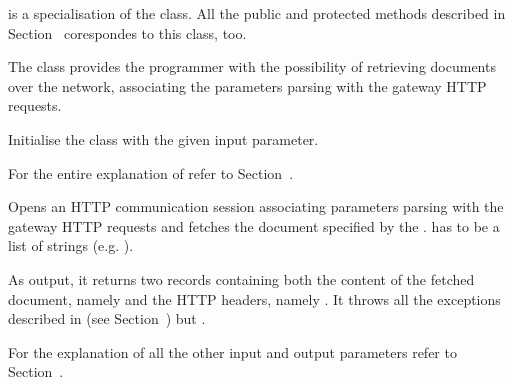 \documentclass{ozdoc}
\begin{document}
 is a specialisation of the  class. All the public and protected methods described in Section~ corespondes to this class, too.

The  class provides the programmer with the possibility of retrieving documents over the network, associating the parameters parsing with the gateway  HTTP requests. \mozartEMPTY
 \mozartEMPTY
\begin{mozartDESCRIPTION}
\mozartENTRYHASCODE
\begin{mozartSYNOPSIS}
\begin{mozartCODEDISPLAY}\mozartFACETEXT{)}\end{mozartCODEDISPLAY}
\end{mozartSYNOPSIS}
\mozartITEM Initialise the class with the given  input parameter.

  \mozartEMPTY
For the entire explanation of  refer to Section~. \mozartEMPTY
{}\mozartENTRYHASCODE
\begin{mozartSYNOPSIS}
\begin{mozartCODEDISPLAY}\mozartFACETEXT{\mozartSPACE{}}\mozartFACETEXT{\mozartSPACE{}}\mozartFACETEXT{\mozartSPACE{}}\mozartFACETEXT{)}\end{mozartCODEDISPLAY}
\end{mozartSYNOPSIS}
\mozartITEM Opens an HTTP communication session associating  parameters parsing with the gateway  HTTP requests and fetches the document specified by the .  has to be a list of  strings (e.g. \mozartCODEINLINE{\mozartFACETEXT{[}\mozartFACESTRING{"Age=35"}\mozartFACETEXT{\mozartSPACE{}}\mozartFACESTRING{"Occupation=research\mozartSPACE{}assistant"}\mozartFACETEXT{]}}). 

As output, it returns two records containing both the content of the fetched document, namely  and the HTTP headers, namely . It throws all the exceptions described in (see Section~) but .  

For the explanation of all the other input and output parameters refer to Section~. \mozartEMPTY
\end{mozartDESCRIPTION}
\end{document}
